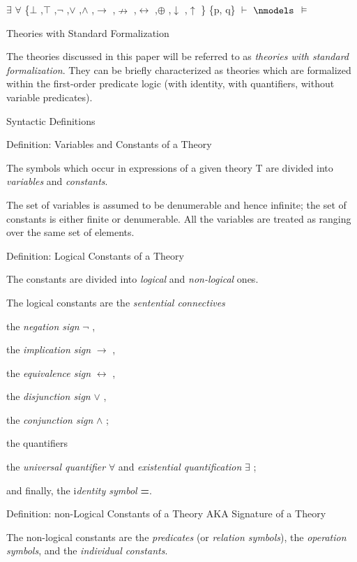 $\exists$ $\forall$  \{$\bot$ ,$\top$ ,$\neg$ ,$\lor$ ,$\land$ ,$\to$ ,$\nrightarrow$ ,$\leftrightarrow$ ,$\oplus$ ,$\downarrow$ ,$\uparrow$ \} \{p, q\} $\vdash$ $\nmodels$ $\models$

\protect\hypertarget{anchor}{}{}Theories with Standard Formalization

The theories discussed in this paper will be referred to as
\emph{theories with standard formalization}. They can be briefly
characterized as theories which are formalized within the first-order
predicate logic (with identity, with quantifiers, without variable
predicates).

\protect\hypertarget{anchor-1}{}{}Syntactic Definitions

\protect\hypertarget{anchor-2}{}{}Definition: Variables and Constants of
a Theory

The symbols which occur in expressions of a given theory T are divided
into \emph{variables} and \emph{constants}.

The set of variables is assumed to be denumerable and hence infinite;
the set of constants is either finite or denumerable. All the variables
are treated as ranging over the same set of elements.

\protect\hypertarget{anchor-3}{}{}Definition: Logical Constants of a
Theory

The constants are divided into \emph{logical} and \emph{non-logical}
ones.

The logical constants are the \emph{sentential connectives}

the \emph{negation sign} $\neg$ ,

the \emph{implication sign} $\to$ ,

the \emph{equivalence sign} $\leftrightarrow$ ,

the \emph{disjunction sign} $\lor$ ,

the \emph{conjunction sign }$\land$ ;

the quantifiers

the \emph{universal quantifier} $\forall$  and \emph{existential quantification}
$\exists$ ;

and finally, the i\emph{dentity symbol} \textbf{=}.

\protect\hypertarget{anchor-4}{}{}

\protect\hypertarget{anchor-5}{}{}Definition: non-Logical Constants of a
Theory AKA Signature of a Theory

The non-logical constants are the \emph{predicates} (or \emph{relation
symbols}), the \emph{operation symbols}, and the \emph{individual
constants}.


